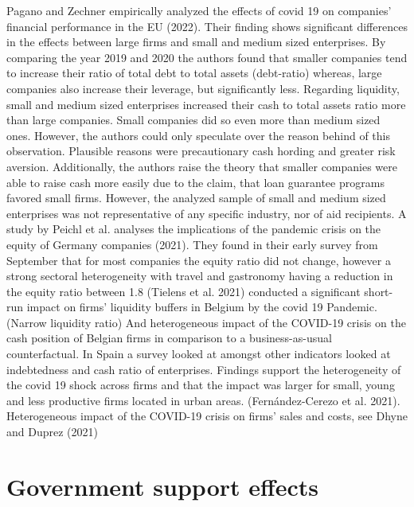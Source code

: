 Pagano and Zechner empirically analyzed the effects of covid 19 on companies’ financial performance in the EU (2022). Their finding shows significant differences in the effects between large firms and small and medium sized enterprises. 
By comparing the year 2019 and 2020 the authors found that smaller companies tend to increase their ratio of total debt to total assets (debt-ratio) whereas, large companies also increase their leverage, but significantly less.
Regarding liquidity, small and medium sized enterprises increased their cash to total assets ratio more than large companies. Small companies did so even more than medium sized ones. However, the authors could only speculate over the reason behind of this observation. Plausible reasons were precautionary cash hording and greater risk aversion. Additionally, the authors raise the theory that smaller companies were able to raise cash more easily due to the claim, that loan guarantee programs favored small firms. However, the analyzed sample of small and medium sized enterprises was not representative of any specific industry, nor of aid recipients. 
A study by Peichl et al. analyses the implications of the pandemic crisis on the equity of Germany companies (2021). They found in their early survey from September that for most companies the equity ratio did not change, however a strong sectoral heterogeneity with travel and gastronomy having a reduction in the equity ratio between 1.8 %
(Tielens et al. 2021) conducted a significant short-run impact on firms’ liquidity buffers in Belgium by the covid 19 Pandemic. (Narrow liquidity ratio) And heterogeneous impact of the COVID-19 crisis on the cash position of Belgian firms in comparison to a business-as-usual counterfactual.
In Spain a survey looked at amongst other indicators looked at indebtedness and cash ratio of enterprises. Findings support the heterogeneity of the covid 19 shock across firms and that the impact was larger for small, young and less productive firms located in urban areas. (Fernández-Cerezo et al. 2021).
Heterogeneous impact of the COVID-19 crisis on firms’ sales and costs, see Dhyne and Duprez (2021)





\section{Government support effects}

